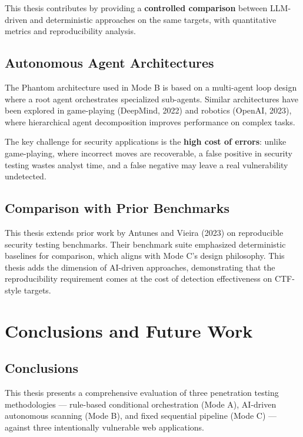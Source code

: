 \documentclass[12pt,a4paper,oneside]{book}
\begin{document}
This thesis contributes by providing a \textbf{controlled comparison} between LLM-driven and deterministic approaches on the same targets, with quantitative metrics and reproducibility analysis.

\section{Autonomous Agent Architectures}

The Phantom architecture used in Mode B is based on a multi-agent loop design where a root agent orchestrates specialized sub-agents. Similar architectures have been explored in game-playing (DeepMind, 2022) and robotics (OpenAI, 2023), where hierarchical agent decomposition improves performance on complex tasks.

The key challenge for security applications is the \textbf{high cost of errors}: unlike game-playing, where incorrect moves are recoverable, a false positive in security testing wastes analyst time, and a false negative may leave a real vulnerability undetected.

\section{Comparison with Prior Benchmarks}

This thesis extends prior work by Antunes and Vieira (2023) on reproducible security testing benchmarks. Their benchmark suite emphasized deterministic baselines for comparison, which aligns with Mode C's design philosophy. This thesis adds the dimension of AI-driven approaches, demonstrating that the reproducibility requirement comes at the cost of detection effectiveness on CTF-style targets.

\chapter{Conclusions and Future Work}

\section{Conclusions}

This thesis presents a comprehensive evaluation of three penetration testing methodologies — rule-based conditional orchestration (Mode A), AI-driven autonomous scanning (Mode B), and fixed sequential pipeline (Mode C) — against three intentionally vulnerable web applications.
\end{document}
